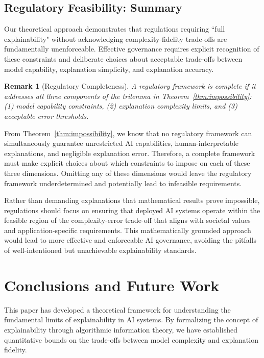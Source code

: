 \documentclass[11pt,letter,leqno]{article}
\newtheorem{remark}[theorem]{Remark}
\begin{document}
\subsection{Regulatory Feasibility: Summary}
\label{subsec:regulatory-conclusion}

Our theoretical approach demonstrates that regulations requiring ``full explainability" without acknowledging complexity-fidelity trade-offs are fundamentally unenforceable.  Effective governance requires explicit recognition of these constraints and deliberate choices about acceptable trade-offs between model capability, explanation simplicity, and explanation accuracy.

\begin{remark}[Regulatory Completeness]
\label{thm:completeness}
A regulatory framework is complete if it addresses all three components of the trilemma in Theorem~\ref{thm:impossibility}: (1) model capability constraints, (2) explanation complexity limits, and (3) acceptable error thresholds.
\end{remark}

From Theorem~\ref{thm:impossibility}, we know that no regulatory framework can simultaneously guarantee unrestricted AI capabilities, human-interpretable explanations, and negligible explanation error.  Therefore, a complete framework must make explicit choices about which constraints to impose on each of these three dimensions.  Omitting any of these dimensions would leave the regulatory framework underdetermined and potentially lead to infeasible requirements.

Rather than demanding explanations that mathematical results prove impossible, regulations should focus on ensuring that deployed AI systems operate within the feasible region of the complexity-error trade-off that aligns with societal values and application-specific requirements.  This mathematically grounded approach would lead to more effective and enforceable AI governance, avoiding the pitfalls of well-intentioned but unachievable explainability standards.

\section{Conclusions and Future Work}
\label{sec:conclusions}

This paper has developed a theoretical framework for understanding the fundamental limits of explainability in AI systems.  By formalizing the concept of explainability through algorithmic information theory, we have established quantitative bounds on the trade-offs between model complexity and explanation fidelity.
\end{document}
